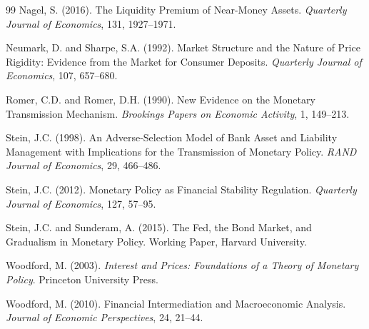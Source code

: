 \documentclass[12pt,a4paper]{article}
\begin{document}
\begin{thebibliography}{99}
Nagel, S. (2016).
\newblock The Liquidity Premium of Near-Money Assets.
\newblock \textit{Quarterly Journal of Economics}, 131, 1927--1971.

Neumark, D. and Sharpe, S.A. (1992).
\newblock Market Structure and the Nature of Price Rigidity: Evidence from the
  Market for Consumer Deposits.
\newblock \textit{Quarterly Journal of Economics}, 107, 657--680.

Romer, C.D. and Romer, D.H. (1990).
\newblock New Evidence on the Monetary Transmission Mechanism.
\newblock \textit{Brookings Papers on Economic Activity}, 1, 149--213.

Stein, J.C. (1998).
\newblock An Adverse-Selection Model of Bank Asset and Liability Management
  with Implications for the Transmission of Monetary Policy.
\newblock \textit{RAND Journal of Economics}, 29, 466--486.

Stein, J.C. (2012).
\newblock Monetary Policy as Financial Stability Regulation.
\newblock \textit{Quarterly Journal of Economics}, 127, 57--95.

Stein, J.C. and Sunderam, A. (2015).
\newblock The Fed, the Bond Market, and Gradualism in Monetary Policy.
\newblock Working Paper, Harvard University.

Woodford, M. (2003).
\newblock \textit{Interest and Prices: Foundations of a Theory of Monetary
  Policy}.
\newblock Princeton University Press.

Woodford, M. (2010).
\newblock Financial Intermediation and Macroeconomic Analysis.
\newblock \textit{Journal of Economic Perspectives}, 24, 21--44.

\end{thebibliography}
\end{document}
